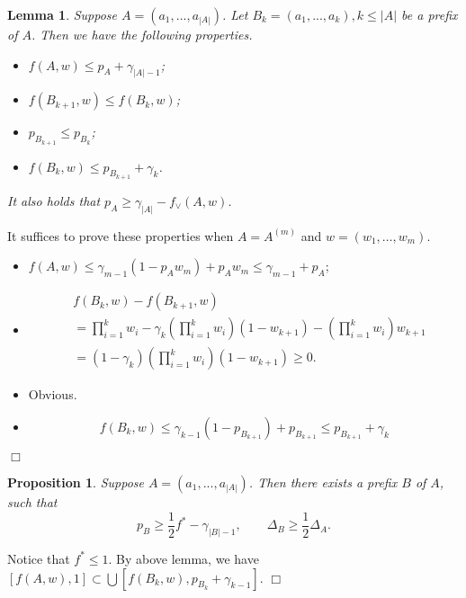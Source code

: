\documentclass{article}
\newcommand{\abs}[1]{\left| #1 \right|}
\newtheorem{proposition}[theorem]{Proposition}%
\newtheorem{lemma}[theorem]{Lemma}%
\newenvironment{proof}{\noindent {\textbf{Proof. }}}{$\Box$ \medskip}
\begin{document}
\begin{lemma}
Suppose $A = (a_1, ..., a_{\abs{A}})$. Let $B_k = (a_1, ..., a_k), k \leq \abs{A}$ be a prefix of $A$. Then we have the following properties.
\begin{itemize}
\item[(1)] $f(A, w) \leq p_A + \gamma_{\abs{A} - 1}$;
\item[(2)] $f(B_{k+1}, w) \leq f(B_k, w)$;
\item[(3)] $p_{B_{k+1}} \leq p_{B_k}$;
\item[(4)] $f(B_k, w) \leq p_{B_{k+1}} + \gamma_{k}$.
\end{itemize}
It also holds that $p_{A} \geq \gamma_{\abs{A}} - f_{\vee}(A, w)$.
\end{lemma}

\begin{proof}
It suffices to prove these properties when $A = A^{(m)}$ and $w = (w_1, \ldots, w_m)$.
\begin{itemize}
\item[(1)]
$f(A, w) \leq \gamma_{m-1}(1 - p_A w_m) + p_A w_m \leq \gamma_{m-1} + p_A$;

\item[(2)]
\begin{align*}
&f(B_k, w) - f(B_{k+1}, w)\\
&=\prod_{i=1}^{k}w_i - \gamma_{k} (\prod_{i=1}^{k}w_i) (1 - w_{k+1}) - (\prod_{i=1}^{k}w_i) w_{k+1}\\
&=(1 - \gamma_{k}) (\prod_{i=1}^{k}w_i) (1 - w_{k+1}) \geq 0.
\end{align*}

\item[(3)]
Obvious.

\item[(4)]
$$
f(B_k, w) \leq \gamma_{k-1} (1 - p_{B_{k+1}}) + p_{B_{k+1}}\leq p_{B_{k+1}} + \gamma_{k}
$$
\end{itemize}
\end{proof}

\begin{proposition}
Suppose $A = (a_1, ..., a_{\abs{A}})$. Then there exists a prefix $B$ of $A$, such that 
$$
p_{B} \geq \frac{1}{2}f^* - \gamma_{\abs{B}-1}, \qquad \Delta_{B} \geq \frac{1}{2}\Delta_A.
$$ 
\end{proposition}
\begin{proof}
	Notice that $f^* \leq 1$. By above lemma, we have $[f(A,w), 1] \subset \bigcup [f(B_k,w), p_{B_k} + \gamma_{k-1}]$.
\end{proof}
\end{document}
